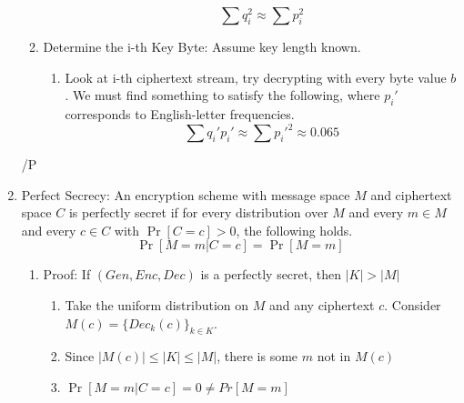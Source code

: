 \documentclass[12pt,letterpaper]{article}
\begin{document}
\begin{enumerate}
\begin{enumerate}
\begin{enumerate}
                \[\sum q_i^2\approx \sum p_i^2\]
            \end{enumerate}
            \item Determine the i-th Key Byte: Assume key length known.
            \begin{enumerate}
                \item Look at i-th ciphertext stream, try decrypting with every byte value $b$. We must find something to satisfy the following, where $p_i'$ corresponds to English-letter frequencies.
                \[\sum q_i'p_i'\approx\sum p_i'^2\approx 0.065\]   
            \end{enumerate}
        \end{enumerate}/P
        \item Perfect Secrecy: An encryption scheme with message space $M$ and ciphertext space $C$ is perfectly secret if for every distribution over $M$ and every $m\in M$ and every $c\in C$ with $\Pr[C=c]>0$, the following holds.
        \[\Pr[M=m|C=c]=\Pr[M=m]\]
        \begin{enumerate}
            \item Proof: If $(Gen, Enc, Dec)$ is a perfectly secret, then $|K|>|M|$
                \begin{enumerate}
                    \item Take the uniform distribution on $M$ and any ciphertext $c$. Consider $M(c)=\{Dec_k(c)\}_{k\in K}$.
                    \item Since $|M(c)|\leq|K|\leq|M|$, there is some $m$ not in $M(c)$
                    \item $\Pr[M=m|C=c]=0\neq Pr[M=m]$
                \end{enumerate}
        \end{enumerate}
        \newpage


\end{enumerate}
\end{document}
